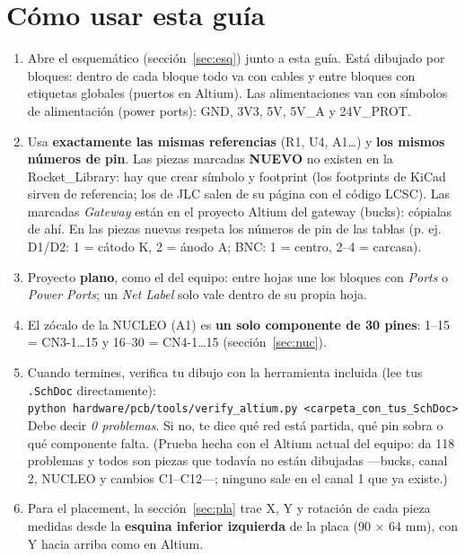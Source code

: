 \documentclass[10pt,a4paper]{article}
\begin{document}
\section*{Cómo usar esta guía}
\begin{enumerate}
\item Abre el esquemático (sección~\ref{sec:esq}) junto a esta guía. Está dibujado por bloques: dentro de cada bloque
todo va con cables y entre bloques con etiquetas globales (puertos en Altium). Las alimentaciones van con
símbolos de alimentación (power ports): GND, 3V3, 5V, 5V\_A y 24V\_PROT.
\item Usa \textbf{exactamente las mismas referencias} (R1, U4, A1…) y \textbf{los mismos números de pin}.
Las piezas marcadas \textbf{NUEVO} no existen en la Rocket\_Library: hay que crear símbolo y footprint
(los footprints de KiCad sirven de referencia; los de JLC salen de su página con el código LCSC). Las marcadas
\emph{Gateway} están en el proyecto Altium del gateway (bucks): cópialas de ahí. En las piezas nuevas respeta
los números de pin de las tablas (p. ej. D1/D2: 1 = cátodo K, 2 = ánodo A; BNC: 1 = centro, 2–4 = carcasa).
\item Proyecto \textbf{plano}, como el del equipo: entre hojas une los bloques con \emph{Ports} o
\emph{Power Ports}; un \emph{Net Label} solo vale dentro de su propia hoja.
\item El zócalo de la NUCLEO (A1) es \textbf{un solo componente de 30 pines}: 1–15 = CN3-1…15 y 16–30 = CN4-1…15
(sección~\ref{sec:nuc}).
\item Cuando termines, verifica tu dibujo con la herramienta incluida (lee tus \texttt{.SchDoc} directamente):\\
\texttt{python hardware/pcb/tools/verify\_altium.py <carpeta\_con\_tus\_SchDoc>}\\
Debe decir \emph{0 problemas}. Si no, te dice qué red está partida, qué pin sobra o qué componente falta.
(Prueba hecha con el Altium actual del equipo: da 118 problemas y todos son piezas que todavía no están
dibujadas —bucks, canal 2, NUCLEO y cambios C1–C12—; ninguno sale en el canal 1 que ya existe.)
\item Para el placement, la sección~\ref{sec:pla} trae X, Y y rotación de cada pieza medidas desde la
\textbf{esquina inferior izquierda} de la placa (90 × 64 mm), con Y hacia arriba como en Altium.
\end{enumerate}
\end{document}
